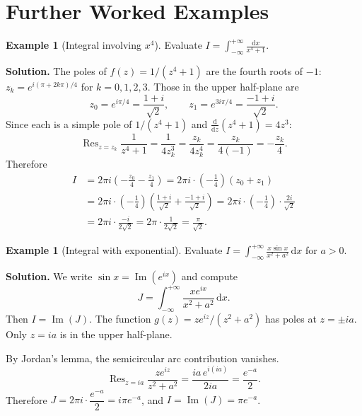 \documentclass[12pt,a4paper,openany]{book}
\theoremstyle{definition}
\newtheorem{example}[definition]{Example}
\theoremstyle{plain}
\theoremstyle{remark}
\DeclareMathOperator{\im}{Im}
\DeclareMathOperator{\Res}{Res}
\newcommand{\dd}{\mathrm{d}}
\begin{document}
\section{Further Worked Examples}\label{sec:more-examples}

\begin{example}[Integral involving $x^4$]\label{ex:extra-1}
Evaluate $\displaystyle I=\int_{-\infty}^{+\infty}
\frac{\dd x}{x^4+1}$.

\medskip\noindent\textbf{Solution.}
The poles of $f(z)=1/(z^4+1)$ are the fourth roots of $-1$:
$z_k=e^{i(\pi+2k\pi)/4}$ for $k=0,1,2,3$.  Those in the upper
half-plane are
\[
  z_0=e^{i\pi/4}=\frac{1+i}{\sqrt{2}},\qquad
  z_1=e^{3i\pi/4}=\frac{-1+i}{\sqrt{2}}.
\]
Since each is a simple pole of $1/(z^4+1)$ and $\frac{\dd}{\dd z}(z^4+1)=4z^3$:
\[
  \Res_{z=z_k}\frac{1}{z^4+1}=\frac{1}{4z_k^3}=\frac{z_k}{4z_k^4}
  =\frac{z_k}{4(-1)}=-\frac{z_k}{4}.
\]
Therefore
\begin{align*}
  I &= 2\pi i\left(-\frac{z_0}{4}-\frac{z_1}{4}\right)
  = 2\pi i\cdot\left(-\frac{1}{4}\right)(z_0+z_1) \\
  &= 2\pi i\cdot\left(-\frac{1}{4}\right)
  \left(\frac{1+i}{\sqrt{2}}+\frac{-1+i}{\sqrt{2}}\right)
  = 2\pi i\cdot\left(-\frac{1}{4}\right)\cdot\frac{2i}{\sqrt{2}} \\
  &= 2\pi i\cdot\frac{-i}{2\sqrt{2}}
  = 2\pi\cdot\frac{1}{2\sqrt{2}}
  = \frac{\pi}{\sqrt{2}}.
\end{align*}
\end{example}

\begin{example}[Integral with exponential]\label{ex:extra-2}
Evaluate $\displaystyle I=\int_{-\infty}^{+\infty}
\frac{x\sin x}{x^2+a^2}\,\dd x$ for $a>0$.

\medskip\noindent\textbf{Solution.}
We write $\sin x=\im(e^{ix})$ and compute
\[
  J=\int_{-\infty}^{+\infty}\frac{xe^{ix}}{x^2+a^2}\,\dd x.
\]
Then $I=\im(J)$.  The function $g(z)=ze^{iz}/(z^2+a^2)$ has poles at
$z=\pm ia$.  Only $z=ia$ is in the upper half-plane.

By Jordan's lemma, the semicircular arc contribution vanishes.
\[
  \Res_{z=ia}\frac{ze^{iz}}{z^2+a^2}
  =\frac{ia\,e^{i(ia)}}{2ia}=\frac{e^{-a}}{2}.
\]
Therefore $J=2\pi i\cdot\dfrac{e^{-a}}{2}=i\pi e^{-a}$, and
$I=\im(J)=\pi e^{-a}$.
\end{example}
\end{document}
